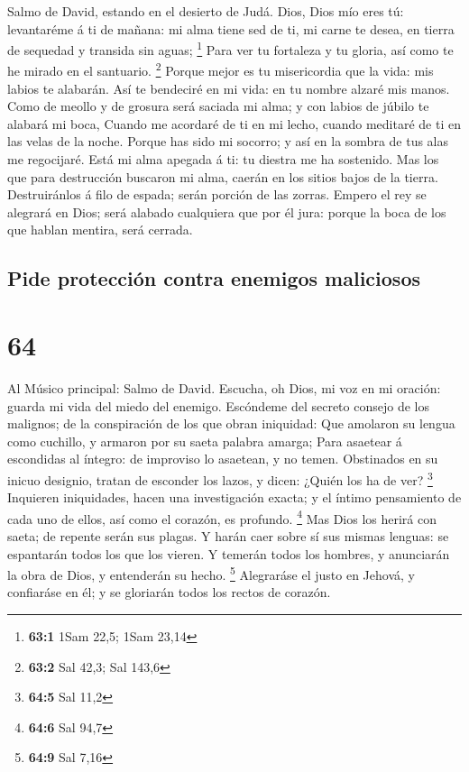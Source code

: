  Salmo de David, estando en el desierto de Judá. Dios, Dios
mío eres tú: levantaréme á ti de mañana: mi alma tiene sed de ti, mi
carne te desea, en tierra de sequedad y transida sin aguas; \footnote{\textbf{63:1}
  1Sam 22,5; 1Sam 23,14}  Para ver tu fortaleza y tu gloria,
así como te he mirado en el santuario. \footnote{\textbf{63:2} Sal 42,3;
  Sal 143,6}  Porque mejor es tu misericordia que la vida:
mis labios te alabarán.  Así te bendeciré en mi vida: en tu
nombre alzaré mis manos.  Como de meollo y de grosura será
saciada mi alma; y con labios de júbilo te alabará mi boca, 
Cuando me acordaré de ti en mi lecho, cuando meditaré de ti en las velas
de la noche.  Porque has sido mi socorro; y así en la sombra
de tus alas me regocijaré.  Está mi alma apegada á ti: tu
diestra me ha sostenido.  Mas los que para destrucción
buscaron mi alma, caerán en los sitios bajos de la tierra. 
Destruiránlos á filo de espada; serán porción de las zorras.
 Empero el rey se alegrará en Dios; será alabado cualquiera
que por él jura: porque la boca de los que hablan mentira, será cerrada.

\hypertarget{pide-protecciuxf3n-contra-enemigos-maliciosos}{%
\subsection{Pide protección contra enemigos
maliciosos}\label{pide-protecciuxf3n-contra-enemigos-maliciosos}}

\hypertarget{section-63}{%
\section{64}\label{section-63}}

 Al Músico principal: Salmo de David. Escucha, oh Dios, mi
voz en mi oración: guarda mi vida del miedo del enemigo. 
Escóndeme del secreto consejo de los malignos; de la conspiración de los
que obran iniquidad:  Que amolaron su lengua como cuchillo,
y armaron por su saeta palabra amarga;  Para asaetear á
escondidas al íntegro: de improviso lo asaetean, y no temen.
 Obstinados en su inicuo designio, tratan de esconder los
lazos, y dicen: ¿Quién los ha de ver? \footnote{\textbf{64:5} Sal 11,2}
 Inquieren iniquidades, hacen una investigación exacta; y el
íntimo pensamiento de cada uno de ellos, así como el corazón, es
profundo. \footnote{\textbf{64:6} Sal 94,7}  Mas Dios los
herirá con saeta; de repente serán sus plagas.  Y harán caer
sobre sí sus mismas lenguas: se espantarán todos los que los vieren.
 Y temerán todos los hombres, y anunciarán la obra de Dios,
y entenderán su hecho. \footnote{\textbf{64:9} Sal 7,16} 
Alegraráse el justo en Jehová, y confiaráse en él; y se gloriarán todos
los rectos de corazón.

